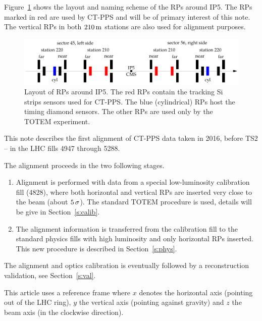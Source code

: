 \documentclass[TOTEM]{cern/cernphprep}
\def\un#1{\,{\rm #1}}
\begin{document}
Figure~\ref{fig:rp_layout} shows the layout and naming scheme \cite{rp-names} of the RPs around IP5. The RPs marked in red are used by CT-PPS and will be of primary interest of this note. The vertical RPs in both $210\un{m}$ stations are also used for alignment purposes.

\begin{figure}[h!]
\begin{center}
\includegraphics{fig/rp_layout.pdf}
\caption{%
Layout of RPs around IP5. The red RPs contain the tracking Si strips sensors used for CT-PPS. The blue (cylindrical) RPs host the timing diamond sensors. The other RPs are used only by the TOTEM experiment.
}
\label{fig:rp_layout}
\end{center}
\end{figure}

This note describes the first alignment of CT-PPS data taken in 2016, before TS2 -- in the LHC fills 4947 through 5288. 

The alignment proceeds in the two following stages.
\begin{enumerate}[nosep]
\item Alignment is performed with data from a special low-luminosity calibration fill (4828), where both horizontal and vertical RPs are inserted very close to the beam (about $5\un{\sigma}$). The standard TOTEM procedure \cite{totem-ijmp} is used, details will be give in Section~\ref{s:calib}.
\item The alignment information is transferred from the calibration fill to the standard physics fills with high luminosity and only horizontal RPs inserted. This new procedure is described in Section~\ref{s:phys}.
\end{enumerate}

The alignment and optics calibration \cite{optics_calibration} is eventually followed by a reconstruction validation, see Section~\ref{s:val}.

This article uses a reference frame where $x$ denotes the horizontal axis (pointing out of the LHC ring), $y$ the vertical axis (pointing against gravity) and $z$ the beam axis (in the clockwise direction).


\end{document}
